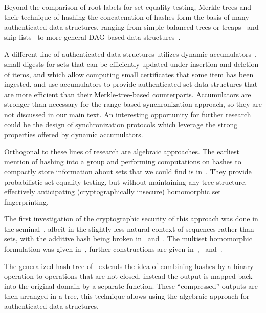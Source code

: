 Beyond the comparison of root labels for set equality testing, Merkle trees and their technique of hashing the concatenation of hashes form the basis of many authenticated data structures, ranging from simple balanced trees or treaps~\cite{naor2000certificate} and skip lists~\cite{goodrich2000efficient} to more general DAG-based data structures~\cite{martel2004general}.

A different line of authenticated data structures utilizes dynamic accumulators~\cite{camenisch2002dynamic}, small digests for sets that can be efficiently updated under insertion and deletion of items, and which allow computing small certificates that some item has been ingested. \cite{papamanthou2016authenticated} and \cite{papamanthou2011optimal} use accumulators to provide authenticated set data structures that are more efficient than their Merkle-tree-based counterparts. Accumulators are stronger than necessary for the range-based synchronization approach, so they are not discussed in our main text. An interesting opportunity for further research could be the design of synchronization protocols which leverage the strong properties offered by dynamic accumulators.

Orthogonal to these lines of research are algebraic approaches. The earliest mention of hashing into a group and performing computations on hashes to compactly store information about sets that we could find is in~\cite{wegman1981new}. They provide probabilistic set equality testing, but without maintaining any tree structure, effectively anticipating (cryptographically insecure) homomorphic set fingerprinting.

The first investigation of the cryptographic security of this approach was done in the seminal~\cite{bellare1997new}, albeit in the slightly less natural context of sequences rather than sets, with the additive hash being broken in~\cite{wagner2002generalized} and~\cite{lyubashevsky2005parity}. The multiset homomorphic formulation was given in~\cite{clarke2003incremental}, further constructions are given in~\cite{cathalo2009comparing},~\cite{maitin2017elliptic} and~\cite{lewi2019securing}.

The generalized hash tree of~\cite{papamanthou2013streaming} extends the idea of combining hashes by a binary operation to operations that are not closed, instead the output is mapped back into the original domain by a separate function. These ``compressed'' outputs are then arranged in a tree, this technique allows using the algebraic approach for authenticated data structures.

